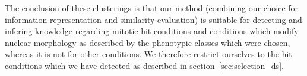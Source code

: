The conclusion of these clusterings is that our method (combining our choice for information representation and similarity evaluation) is suitable for detecting and infering knowledge
regarding mitotic hit conditions and conditions which modify nuclear
morphology as described by the phenotypic classes which were chosen,
whereas it is not for other conditions. We therefore restrict ourselves to the hit conditions which we have detected as described in section~\ref{sec:selection_ds}. 



%

